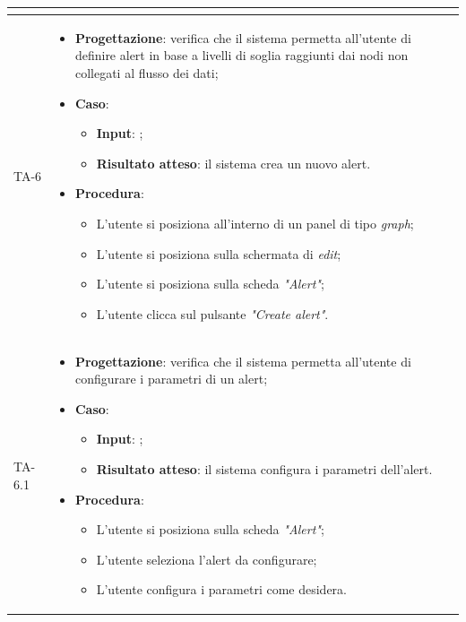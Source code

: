 \begin{longtable}{|C{2.5cm}|C{13cm}|}
\begin{itemize}
\begin{itemize}
	\end{itemize} 
\end{itemize} \\
\hline
{TA-6} &
\begin{itemize}
	\item \textbf{Progettazione}: verifica che il sistema permetta all'utente di definire alert in base a livelli di soglia raggiunti dai nodi non collegati al flusso dei dati;
	\item \textbf{Caso}: 
	\begin{itemize}
		\item \textbf{Input}: ;
		\item \textbf{Risultato atteso}: il sistema crea un nuovo alert.
	\end{itemize}
	\item \textbf{Procedura}:
	\begin{itemize}
		\item L'utente si posiziona all'interno di un panel di tipo \emph{graph};
		\item L'utente si posiziona sulla schermata di \emph{edit};
		\item L'utente si posiziona sulla scheda \emph{"Alert"};
		\item L'utente clicca sul pulsante \emph{"Create alert"}.
	\end{itemize} 
\end{itemize} \\
\hline
{TA-6.1} &
\begin{itemize}
	\item \textbf{Progettazione}: verifica che il sistema permetta all'utente di configurare i parametri di un alert;
	\item \textbf{Caso}: 
	\begin{itemize}
		\item \textbf{Input}: ;
		\item \textbf{Risultato atteso}: il sistema configura i parametri dell'alert.
	\end{itemize}
	\item \textbf{Procedura}:
	\begin{itemize}
		\item L'utente si posiziona sulla scheda \emph{"Alert"};
		\item L'utente seleziona l'alert da configurare;
		\item L'utente configura i parametri come desidera.
	\end{itemize} 
\end{itemize} \\

\end{longtable}
